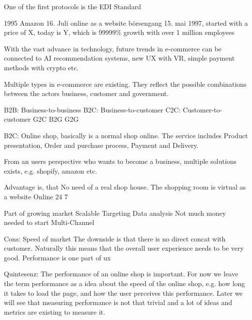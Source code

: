 One of the first protocols is the EDI Standard

1995 Amazon 16. Juli online as a website
börsengang 15. mai 1997, started with a price of X, today is Y, which is 99999\% growth
with over 1 million employees



With the vast advance in technology, future trends in e-commerce can be connected to AI recommendation systems, new UX with VR, simple payment methods with crypto etc.







Multiple types in e-commerce are existing. They reflect the possible combinations between the actors business, customer and government.

B2B: Business-to-business
B2C: Business-to-customer
C2C: Customer-to-customer
G2C
B2G
G2G





B2C: Online shop, basically is a normal shop online.
The service includes Product presentation, Order and purchase process, Payment and Delivery.


From an users perspective who wants to become a business, multiple solutions exists, e.g. shopify, amazon etc.



Advantage is, that No need of a real shop house. The shopping room is virtual as a website
Online 24 7

Part of growing market
Scalable
Targeting
Data analysis
Not much money needed to start
Multi-Channel

Cons: Speed of market
The downside is that there is no direct concat with customer.
Naturally this means that the overall user experience needs to be very good.
Performance is one part of ux





Quintesenz: The performance of an online shop is important.
For now we leave the term performance as a idea about the speed of the online shop, e.g. how long it takes to load the page, and how the user perceives this performance.
Later we will see that measuring performance is not that trivial and a lot of ideas and metrics are existing to measure it.




